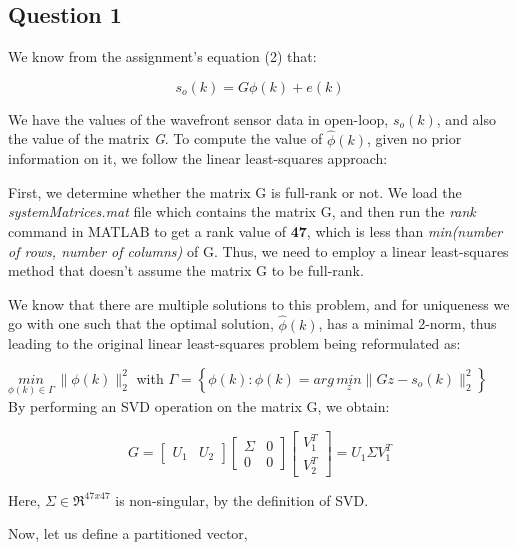 \documentclass[12pt]{report}
\begin{document}
\subsection*{Question 1}

We know from the assignment's equation (2) that:

\begin{equation*}
	s_{o}(k) = G\phi(k) + e(k)
\end{equation*}

We have the values of the wavefront sensor data in open-loop, $s_{o}(k)$, and also the value of the matrix \textit{G}. To compute the value of $\hat\phi(k)$, given no prior information on it, we follow the linear least-squares approach:

First, we determine whether the matrix G is full-rank or not. We load the \textit{systemMatrices.mat} file which contains the matrix G, and then run the \textit{rank} command in MATLAB to get a rank value of \textbf{47}, which is less than \textit{min(number of rows, number of columns)} of G. Thus, we need to employ a linear least-squares method that doesn't assume the matrix G to be full-rank.

We know that there are multiple solutions to this problem, and for uniqueness we go with one such that the optimal solution, $\hat\phi(k)$, has a minimal 2-norm, thus leading to the original linear least-squares problem being reformulated as:

$\underset{\phi(k) \in \Gamma}{min} \, \|\phi(k)\|_{2}^{2}$ \space	with \space	$\Gamma = \left\{ \phi(k) : \phi(k) = arg \, \underset{z}{min} \| Gz - s_{o}(k)\|_{2}^{2}\right\}$
\\
By performing an SVD operation on the matrix G, we obtain:

\begin{equation*}
G = \begin{bmatrix}
U_{1} & U_{2}
\end{bmatrix}\begin{bmatrix}
\Sigma & 0 \\
0 & 0
\end{bmatrix}
\begin{bmatrix}
V_{1}^{T} \\
V_{2}^{T}
\end{bmatrix}
= U_{1}\Sigma V_{1}^{T}
\end{equation*}

Here, $\Sigma \in \Re^{47x47}$ is non-singular, by the definition of SVD. 

Now, let us define a partitioned vector,
\end{document}
